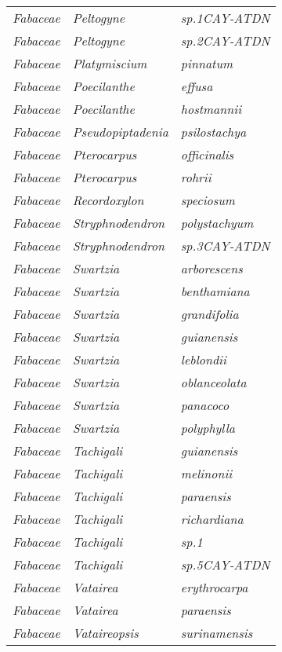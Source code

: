 \documentclass[fleqn,10pt]{ArtEcoFoG} %
\renewenvironment{table}{\begin{table*}}{\end{table*}\ignorespacesafterend}
\begin{document}
\begin{table}
\begin{tabular}[t]{lll}
\em{Fabaceae} & \em{Peltogyne} & \em{sp.1CAY-ATDN}\\
\addlinespace
\em{Fabaceae} & \em{Peltogyne} & \em{sp.2CAY-ATDN}\\
\em{Fabaceae} & \em{Platymiscium} & \em{pinnatum}\\
\em{Fabaceae} & \em{Poecilanthe} & \em{effusa}\\
\em{Fabaceae} & \em{Poecilanthe} & \em{hostmannii}\\
\em{Fabaceae} & \em{Pseudopiptadenia} & \em{psilostachya}\\
\addlinespace
\em{Fabaceae} & \em{Pterocarpus} & \em{officinalis}\\
\em{Fabaceae} & \em{Pterocarpus} & \em{rohrii}\\
\em{Fabaceae} & \em{Recordoxylon} & \em{speciosum}\\
\em{Fabaceae} & \em{Stryphnodendron} & \em{polystachyum}\\
\em{Fabaceae} & \em{Stryphnodendron} & \em{sp.3CAY-ATDN}\\
\addlinespace
\em{Fabaceae} & \em{Swartzia} & \em{arborescens}\\
\em{Fabaceae} & \em{Swartzia} & \em{benthamiana}\\
\em{Fabaceae} & \em{Swartzia} & \em{grandifolia}\\
\em{Fabaceae} & \em{Swartzia} & \em{guianensis}\\
\em{Fabaceae} & \em{Swartzia} & \em{leblondii}\\
\addlinespace
\em{Fabaceae} & \em{Swartzia} & \em{oblanceolata}\\
\em{Fabaceae} & \em{Swartzia} & \em{panacoco}\\
\em{Fabaceae} & \em{Swartzia} & \em{polyphylla}\\
\em{Fabaceae} & \em{Tachigali} & \em{guianensis}\\
\em{Fabaceae} & \em{Tachigali} & \em{melinonii}\\
\addlinespace
\em{Fabaceae} & \em{Tachigali} & \em{paraensis}\\
\em{Fabaceae} & \em{Tachigali} & \em{richardiana}\\
\em{Fabaceae} & \em{Tachigali} & \em{sp.1}\\
\em{Fabaceae} & \em{Tachigali} & \em{sp.5CAY-ATDN}\\
\em{Fabaceae} & \em{Vatairea} & \em{erythrocarpa}\\
\addlinespace
\em{Fabaceae} & \em{Vatairea} & \em{paraensis}\\
\em{Fabaceae} & \em{Vataireopsis} & \em{surinamensis}\\

\end{tabular}
\end{table}
\end{document}
